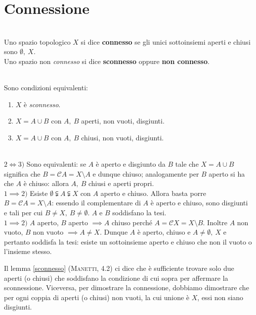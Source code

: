 \section{Connessione}
\begin{define}~{}\\
Uno spazio topologico $X$ si dice \textbf{connesso} se gli unici sottoinsiemi aperti e chiusi sono $\emptyset,\ X$.\\
Uno spazio non \textit{connesso} si dice \textbf{sconnesso} oppure \textbf{non connesso}.
\end{define}
\begin{lemming}~{}\\ \label{sconnesso}
	Sono condizioni equivalenti:
	\begin{enumerate}
		\item $X$ è \textit{sconnesso}.
		\item $X=A\cup B$ con $A,\ B$ aperti, non vuoti, disgiunti.
		\item $X=A\cup B$ con $A,\ B$ chiusi, non vuoti, disgiunti.
	\end{enumerate}
\vspace{-3mm}
\end{lemming}
\begin{demonstration}~{}\\
$2\iff3)$ Sono equivalenti: se $A$ è aperto e disgiunto da $B$ tale che $X=A\cup B$ significa che $B=\mathcal{C}A=X\setminus A$ e dunque chiuso; analogamente per $B$ aperto si ha che $A$ è chiuso: allora $A,\ B$ chiusi e aperti propri.\\
$1\implies2)$ Esiste $\emptyset\subsetneqq A \subsetneqq X$ con $A$ aperto e chiuso. Allora basta porre $B=\mathcal{C}A=X\setminus A$: essendo il complementare di $A$ è aperto e chiuso, sono disgiunti e tali per cui $B\neq X,\ B\neq \emptyset$. $A$ e $B$ soddisfano la tesi.\\
$1\implies2)$ $A$ aperto, $B$ aperto $\implies A$ chiuso perché $A=\mathcal{C}X=X\setminus B$. Inoltre $A$ non vuoto, $B$ non vuoto $\implies A\neq X$. Dunque $A$ è aperto, chiuso e $A\neq \emptyset,\ X$ e pertanto soddisfa la tesi: esiste un sottoinsieme aperto e chiuso che non il vuoto o l'insieme stesso.
\end{demonstration}
\begin{observe}
	Il lemma \ref{sconnesso} \textsc{(Manetti, 4.2)} ci dice che è sufficiente trovare solo due aperti (o chiusi) che soddisfano la condizione di cui sopra per affermare la sconnessione. Viceversa, per dimostrare la connessione, dobbiamo dimostrare che per ogni coppia di aperti (o chiusi) non vuoti, la cui unione è $X$, essi non siano disgiunti.
\end{observe}
